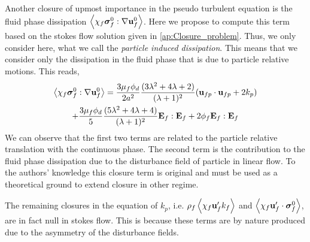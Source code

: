 Another closure of upmost importance in the pseudo turbulent equation is the fluid phase dissipation $\left<\chi_f \bm\sigma_f^0 :\mathbf{\nabla}\textbf{u}_f^0\right>$. 
Here we propose to compute this term based on the stokes flow solution given in \ref{ap:Closure_problem}. 
Thus, we only consider here, what we call the \textit{particle induced dissipation}.
This means that we consider only the dissipation in the fluid phase that is due to particle relative motions. 
This reads, 
\begin{multline}
    \left<\chi_f \bm\sigma_f^0 :\mathbf{\nabla}\textbf{u}_f^0\right>
    =
    \frac{3\mu_f \phi_d}{2a^2}
    \frac{(3\lambda^2 + 4\lambda +2)}{(\lambda + 1)^2}
    (\textbf{u}_{fp}\cdot \textbf{u}_{fp} + 2 k_p ) \\
    + 
    \frac{3\mu_f \phi_d}{5}
    \frac{(5\lambda^2 + 4\lambda +4)}{(\lambda + 1)^2}
    \textbf{E}_f:\textbf{E}_f
    +2 \phi_f \textbf{E}_f:\textbf{E}_f
\end{multline}
We can observe that the first two terms are related to the particle relative translation with the continuous phase. 
The second term is the contribution to the fluid phase dissipation due to the  disturbance field of particle in linear flow. 
To the authors' knowledge this closure term is original and must be used as a theoretical ground to extend closure in other regime. 

The remaining closures in the equation of $k_p$, i.e. $\rho_f \left<\chi_f \textbf{u}_f' k_f\right>$ and $\left<\chi_f \textbf{u}_f' \cdot \bm{\sigma}_f^0\right>$, are in fact null in stokes flow. 
This is because these terms are by nature produced due to the asymmetry of the disturbance fields. 


